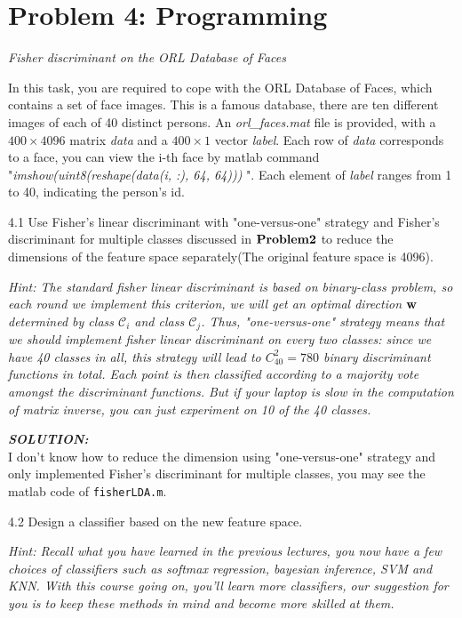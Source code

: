 \documentclass{article}
\theoremstyle{definition}
\theoremstyle{definition}
\theoremstyle{remark}
\begin{document}
\section*{Problem 4: Programming}
\emph{Fisher discriminant on the ORL Database of Faces}

In this task, you are required to cope with the ORL Database of Faces, which contains a set of face images. This is a famous database, there are ten different images of each of 40 distinct persons. An \emph{orl\_faces.mat} file is provided, with a $400\times 4096$ matrix \emph{data} and a $400\times 1$ vector \emph{label}. Each row of \emph{data} corresponds to a face, you can view the i-th face by matlab command "\emph{imshow(uint8(reshape(data(i, :), 64, 64)))} ". Each element of \emph{label} ranges from 1 to 40, indicating the person's id.

4.1 Use Fisher's linear discriminant with "one-versus-one" strategy and Fisher's discriminant for multiple classes discussed in $\bold{Problem 2}$ to reduce the dimensions of the feature space separately(The original feature space is 4096).

\emph{Hint: The standard fisher linear discriminant is based on binary-class problem, so each round we implement this criterion, we will get an optimal direction $\bold{w}$ determined by class $\mathcal{C}_{i}$ and class $\mathcal{C}_{j}$. Thus, "one-versus-one" strategy means that we should implement fisher linear discriminant on every two classes: since we have 40 classes in all, this strategy will lead to $C_{40}^{2}=780$ binary discriminant functions in total. Each point is then classified according to a majority vote amongst the discriminant functions. But if your laptop is slow in the computation of matrix inverse, you can just experiment on 10 of the 40 classes.}

\emph{\textbf{SOLUTION:}}\\
I don't know how to reduce the dimension using "one-versus-one" strategy and only implemented Fisher's discriminant for multiple classes, you may see the matlab code of \texttt{fisherLDA.m}.

4.2 Design a classifier based on the new feature space.

\emph{Hint: Recall what you have learned in the previous lectures, you now have a few choices of classifiers such as softmax regression, bayesian inference, SVM and KNN. With this course going on, you'll learn more classifiers, our suggestion for you is to keep these methods in mind and become more skilled at them.}
\end{document}
